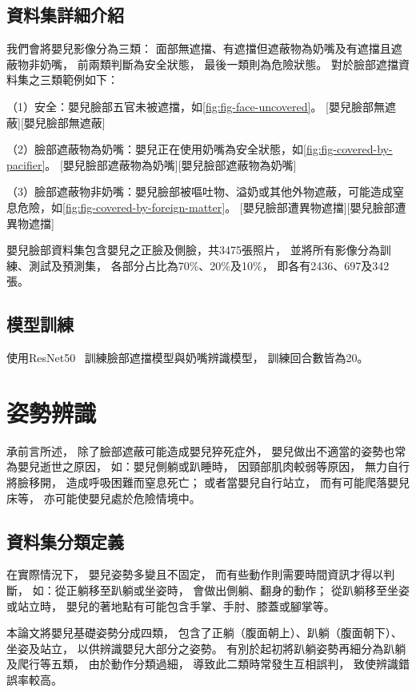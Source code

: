 \documentclass[class=NCU_thesis, crop=false]{standalone}
\begin{document}
\subsection{資料集詳細介紹}
我們會將嬰兒影像分為三類：
面部無遮擋、有遮擋但遮蔽物為奶嘴及有遮擋且遮蔽物非奶嘴，
前兩類判斷為安全狀態，
最後一類則為危險狀態。
對於臉部遮擋資料集之三類範例如下：

（1）安全：嬰兒臉部五官未被遮擋，如\cref{fig:fig-face-uncovered}。
[嬰兒臉部無遮蔽][嬰兒臉部無遮蔽]

（2）臉部遮蔽物為奶嘴：嬰兒正在使用奶嘴為安全狀態，如\cref{fig:fig-covered-by-pacifier}。
[嬰兒臉部遮蔽物為奶嘴][嬰兒臉部遮蔽物為奶嘴]

（3）臉部遮蔽物非奶嘴：嬰兒臉部被嘔吐物、溢奶或其他外物遮蔽，可能造成窒息危險，如\cref{fig:fig-covered-by-foreign-matter}。
[嬰兒臉部遭異物遮擋][嬰兒臉部遭異物遮擋]

嬰兒臉部資料集包含嬰兒之正臉及側臉，共3475張照片，
並將所有影像分為訓練、測試及預測集，
各部分占比為70\%、20\%及10\%，
即各有2436、697及342張。

\subsection{模型訓練}
使用ResNet50~\cite{he_deep_2016}
訓練臉部遮擋模型與奶嘴辨識模型，
訓練回合數皆為20。

\section{姿勢辨識}
承前言所述，
除了臉部遮蔽可能造成嬰兒猝死症外，
嬰兒做出不適當的姿勢也常為嬰兒逝世之原因，
如：嬰兒側躺或趴睡時，
因頸部肌肉較弱等原因，
無力自行將臉移開，
造成呼吸困難而窒息死亡；
或者當嬰兒自行站立，
而有可能爬落嬰兒床等，
亦可能使嬰兒處於危險情境中。

\subsection{資料集分類定義}
在實際情況下，
嬰兒姿勢多變且不固定，
而有些動作則需要時間資訊才得以判斷，
如：從正躺移至趴躺或坐姿時，
會做出側躺、翻身的動作；
從趴躺移至坐姿或站立時，
嬰兒的著地點有可能包含手掌、手肘、膝蓋或腳掌等。

本論文將嬰兒基礎姿勢分成四類，
包含了正躺（腹面朝上）、趴躺（腹面朝下）、坐姿及站立，
以供辨識嬰兒大部分之姿勢。
有別於起初將趴躺姿勢再細分為趴躺及爬行等五類，
由於動作分類過細，
導致此二類時常發生互相誤判，
致使辨識錯誤率較高。
\end{document}
